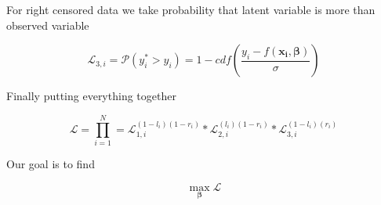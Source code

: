 \documentclass[11pt]{article}
\begin{document}
    For right censored data we take probability that latent variable is more than observed variable

    \begin{equation}
        \mathcal{L}_{3,i} = \mathcal{P}(y^*_i > y_i) = 1 - cdf(\frac{y_i - f(\boldsymbol{x_i},\boldsymbol{\beta})}{\sigma})
    \end{equation}

    Finally putting everything together

    \begin{equation}
    \mathcal{L} = \prod_{i=1}^N = \mathcal{L}_{1,i}^{(1-l_i)(1-r_i)} * \mathcal{L}_{2,i}^{(l_i)(1-r_i)} * \mathcal{L}_{3,i}^{(1-l_i)(r_i)}
    \end{equation}

    Our goal is to find

    \begin{equation}
    \max_{\boldsymbol{\beta}} \mathcal{L}
    \end{equation}
\end{document}
